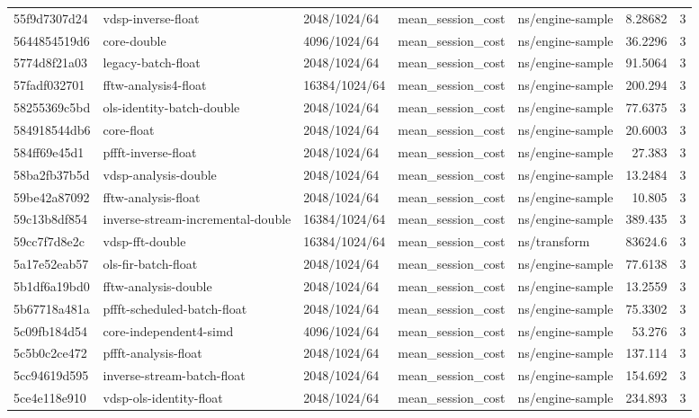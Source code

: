 \begin{longtable}{lllllrr}
55f9d7307d24 & vdsp-inverse-float & 2048/1024/64 & mean\_session\_cost & ns/engine-sample & 8.28682 & 3 \\
5644854519d6 & core-double & 4096/1024/64 & mean\_session\_cost & ns/engine-sample & 36.2296 & 3 \\
5774d8f21a03 & legacy-batch-float & 2048/1024/64 & mean\_session\_cost & ns/engine-sample & 91.5064 & 3 \\
57fadf032701 & fftw-analysis4-float & 16384/1024/64 & mean\_session\_cost & ns/engine-sample & 200.294 & 3 \\
58255369c5bd & ols-identity-batch-double & 2048/1024/64 & mean\_session\_cost & ns/engine-sample & 77.6375 & 3 \\
584918544db6 & core-float & 2048/1024/64 & mean\_session\_cost & ns/engine-sample & 20.6003 & 3 \\
584ff69e45d1 & pffft-inverse-float & 2048/1024/64 & mean\_session\_cost & ns/engine-sample & 27.383 & 3 \\
58ba2fb37b5d & vdsp-analysis-double & 2048/1024/64 & mean\_session\_cost & ns/engine-sample & 13.2484 & 3 \\
59be42a87092 & fftw-analysis-float & 2048/1024/64 & mean\_session\_cost & ns/engine-sample & 10.805 & 3 \\
59c13b8df854 & inverse-stream-incremental-double & 16384/1024/64 & mean\_session\_cost & ns/engine-sample & 389.435 & 3 \\
59cc7f7d8e2c & vdsp-fft-double & 16384/1024/64 & mean\_session\_cost & ns/transform & 83624.6 & 3 \\
5a17e52eab57 & ols-fir-batch-float & 2048/1024/64 & mean\_session\_cost & ns/engine-sample & 77.6138 & 3 \\
5b1df6a19bd0 & fftw-analysis-double & 2048/1024/64 & mean\_session\_cost & ns/engine-sample & 13.2559 & 3 \\
5b67718a481a & pffft-scheduled-batch-float & 2048/1024/64 & mean\_session\_cost & ns/engine-sample & 75.3302 & 3 \\
5c09fb184d54 & core-independent4-simd & 4096/1024/64 & mean\_session\_cost & ns/engine-sample & 53.276 & 3 \\
5c5b0c2ce472 & pffft-analysis-float & 2048/1024/64 & mean\_session\_cost & ns/engine-sample & 137.114 & 3 \\
5cc94619d595 & inverse-stream-batch-float & 2048/1024/64 & mean\_session\_cost & ns/engine-sample & 154.692 & 3 \\
5ce4e118e910 & vdsp-ols-identity-float & 2048/1024/64 & mean\_session\_cost & ns/engine-sample & 234.893 & 3 \\

\end{longtable}
